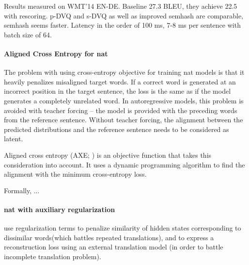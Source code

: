 Results measured on WMT'14 EN-DE. Baseline 27.3 BLEU, they achieve 22.5 with
rescoring. p-DVQ and s-DVQ as well as improved semhash are comparable, semhash
seems faster. Latency in the order of 100 ms, 7-8 ms per sentence with batch
size of 64.


\paragraph{Aligned Cross Entropy for \gls{nat}} The problem with using
cross-entropy objective for training \gls{nat} models is that it heavily
penalizes misaligned target words. If a correct word is generated at an
incorrect position in the target sentence, the loss is the same as if the model
generates a completely unrelated word. In autoregressive models, this problem
is avoided with teacher forcing -- the model is provided with the preceding
words from the reference sentence. Without teacher forcing, the alignment
between the predicted distributions and the reference sentence needs to be
considered as latent.

Aligned cross entropy (AXE; \citealp{ghazvininejad2020aligned}) is an objective
function that takes this consideration into account. It uses a dynamic
programming algorithm to find the alignment with the minimum cross-entropy
loss.

Formally, ... 


\paragraph{\Gls{nat} with auxiliary regularization}
\citet{wang2019nonautoregressive} use regularization terms to penalize
similarity of hidden states corresponding to dissimilar words(which battles
repeated translations), and to express a reconstruction loss using an external
translation model (in order to battle incomplete translation problem).

\paragraph{\citep{shao2020minimizing}}




